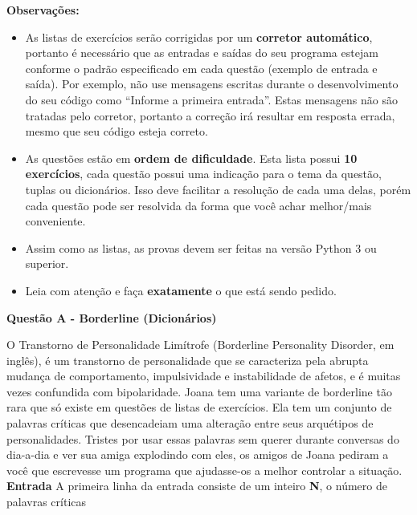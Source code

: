 \documentclass[a4paper, 12pt]{article}
\begin{document}
\textbf{{\large Observações:}}
\begin{itemize}
	\item As listas de exercícios serão corrigidas por um \textbf{corretor automático}, portanto é necessário que as entradas e saídas do seu programa estejam conforme o padrão especificado em cada questão (exemplo de entrada e saída). Por exemplo, não use mensagens escritas durante o desenvolvimento do seu código como ``Informe a primeira entrada''. Estas mensagens não são tratadas pelo corretor, portanto a correção irá resultar em resposta errada, mesmo que seu código esteja correto.
	\item As questões estão em \textbf{ordem de dificuldade}. Esta lista possui \textbf{10 exercícios}, cada questão possui uma indicação para o tema da questão, tuplas ou dicionários. Isso deve facilitar a resolução de cada uma delas, porém cada questão pode ser resolvida da forma que você achar melhor/mais conveniente.
	\item Assim como as listas, as provas devem ser feitas na versão Python 3 ou superior.
	\item Leia com atenção e faça \textbf{exatamente} o que está sendo pedido.
\end{itemize}
\newpage %
\begin{center}
\textbf{{\Large Questão A - Borderline (Dicionários)}}
\end{center}
\vspace{5pt}
O Transtorno de Personalidade Limítrofe (Borderline Personality Disorder, em
inglês), é um transtorno de personalidade que se caracteriza pela abrupta
mudança de comportamento, impulsividade e instabilidade de afetos, e é muitas
vezes confundida com bipolaridade. \newline \newline
Joana tem uma variante de borderline tão rara que só existe em questões de listas
de exercícios. Ela tem um conjunto de palavras críticas que desencadeiam uma
alteração entre seus arquétipos de personalidades. \newline \newline
Tristes por usar essas palavras sem querer durante conversas do dia-a-dia e ver
sua amiga explodindo com eles, os amigos de Joana pediram a você que
escrevesse um programa que ajudasse-os a melhor controlar a situação.
\newline \newline
\textbf{{\large Entrada}} \newline
A primeira linha da entrada consiste de um inteiro \textbf{N}, o número de palavras críticas
\end{document}

